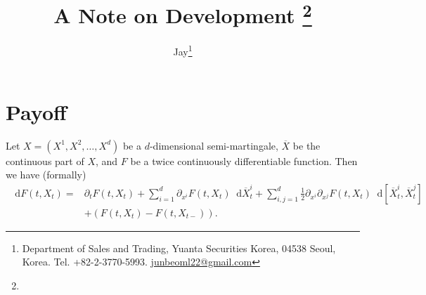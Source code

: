\documentclass[onefignum,onetabnum]{siamart190516}
\title{A Note on Development \thanks{}  }
\author{Jay\thanks{Department of Sales and Trading, Yuanta Securities
    Korea, 04538 Seoul, Korea. 
              Tel. +82-2-3770-5993.
              \href{junbeoml22@gmail.com}{junbeoml22@gmail.com}}}
\numberwithin{equation}{section}
\newcommand{\Xo}{\overline{X}}
\newcommand{\1}{\mathds{1}}
\newcommand{\SUM}{\displaystyle\sum}
\newcommand*\df{\mathop{}\!\mathrm{d}}
\begin{document}
  

\maketitle

\begin{abstract}
\end{abstract}

\begin{keywords}
\end{keywords}

\begin{AMS}
 
\end{AMS}

 
\section{Payoff}
\begin{proposition}
 Let $X=(X^1, X^2, \dots, X^d)$ be a $d$-dimensional semi-martingale, $\Xo$ be
 the continuous part of $X$, and $F$ be
 a twice continuously differentiable function. Then we have (formally)
 \begin{align}
   \df F(t, X_t) =& \partial_t F(t, X_t) + \SUM_{i=1}^d\partial_{x^i} F(t, X_t) \df \Xo^i_t  +
                    \SUM_{i, j=1}^d\frac{1}{2}\partial_{x^i}\partial_{x^j} F(t, X_t) \df
                    [\Xo^i_t, \Xo^j_t ] \nonumber \\
                  &+(F(t, X_{t}) - F(t, X_{t-})). \label{ito}
 \end{align}
\end{proposition}
\end{document}
